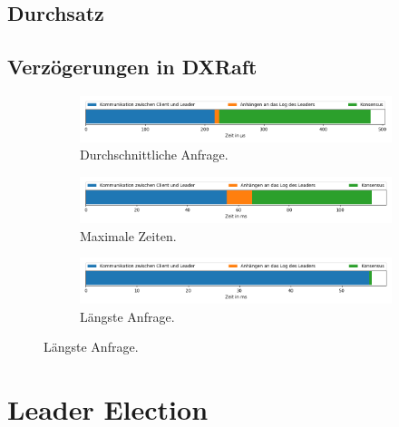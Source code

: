\subsection{Durchsatz}

\subsection{Verzögerungen in DXRaft}

\begin{figure}[t]
	\centering
	\begin{subfigure}[t]{1\textwidth}
		\includegraphics[width=\textwidth]{img/request_avg_timing.png}
		\caption{Durchschnittliche Anfrage.}
	\end{subfigure}
	\begin{subfigure}[t]{1\textwidth}
		\includegraphics[width=\textwidth]{img/request_max_timing.png}
		\caption{Maximale Zeiten.}
	\end{subfigure}
	\begin{subfigure}[t]{1\textwidth}
		\includegraphics[width=\textwidth]{img/request_longest_timing.png}
		\caption{Längste Anfrage.}
	\end{subfigure}
\end{figure}

\section{Leader Election}


